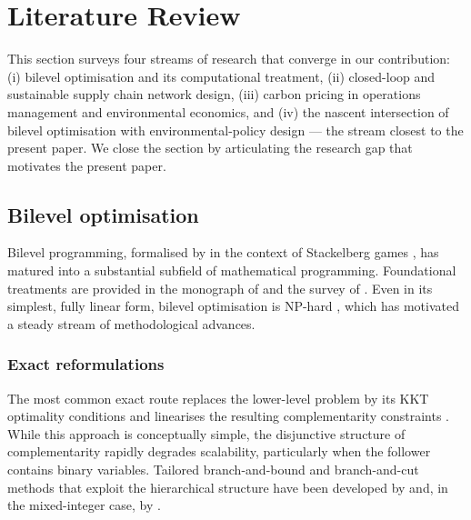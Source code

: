 
\section{Literature Review}
\label{sec:literature}

This section surveys four streams of research that converge in our
contribution: (i) bilevel optimisation and its computational
treatment, (ii) closed-loop and sustainable supply chain network
design, (iii) carbon pricing in operations management and
environmental economics, and (iv) the nascent intersection of
bilevel optimisation with environmental-policy design --- the stream
closest to the present paper. We close the section by articulating
the research gap that motivates the present paper.

\subsection{Bilevel optimisation}
\label{sec:lit:bilevel}

Bilevel programming, formalised by \citet{bracken1973} in the
context of Stackelberg games \citep{vonStackelberg1934}, has matured
into a substantial subfield of mathematical programming. Foundational
treatments are provided in the monograph of \citet{dempe2002} and the
survey of \citet{colson2007}. Even in its simplest, fully linear
form, bilevel optimisation is NP-hard \citep{jeroslow1985, hansen1992},
which has motivated a steady stream of methodological advances.

\subsubsection{Exact reformulations}
\label{sec:lit:exact}

The most common exact route
replaces the lower-level problem by its KKT optimality conditions and
linearises the resulting complementarity constraints
\citep{fortuny1981}. While this approach is conceptually simple, the
disjunctive structure of complementarity rapidly degrades scalability,
particularly when the follower contains binary variables. Tailored
branch-and-bound and branch-and-cut methods that exploit the
hierarchical structure have been developed by \citet{moore1990} and,
in the mixed-integer case, by \citet{denegre2011}.

